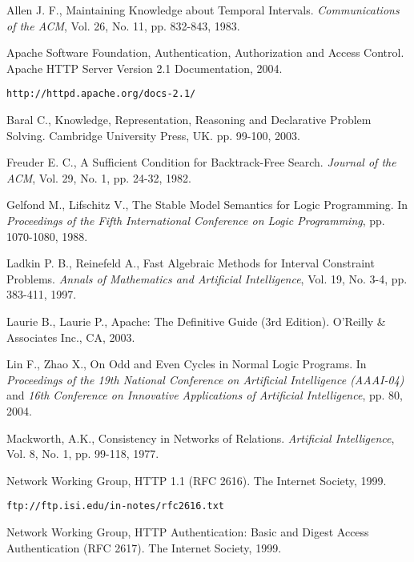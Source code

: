 \documentclass[11pt]{report}
\begin{document}
  \begin{thebibliography}{M}
      Allen J. F.,
      Maintaining Knowledge about Temporal Intervals.
      {\em Communications of the ACM},
      Vol. 26, No. 11, pp. 832-843,
      1983.

      Apache Software Foundation,
      Authentication, Authorization and Access Control.
      Apache HTTP Server Version 2.1 Documentation,
      2004.

      {\tt http://httpd.apache.org/docs-2.1/}

      Baral C.,
      Knowledge, Representation, Reasoning and Declarative Problem Solving.
      Cambridge University Press, UK.
      pp. 99-100,
      2003.

      Freuder E. C.,
      A Sufficient Condition for Backtrack-Free Search.
      {\em Journal of the ACM},
      Vol. 29, No. 1, pp. 24-32,
      1982.

      Gelfond M., Lifschitz V.,
      The Stable Model Semantics for Logic Programming.
      In {\em Proceedings of the Fifth International Conference on Logic Programming},
      pp. 1070-1080,
      1988.

      Ladkin P. B., Reinefeld A.,
      Fast Algebraic Methods for Interval Constraint Problems.
      {\em Annals of Mathematics and Artificial Intelligence},
      Vol. 19, No. 3-4, pp. 383-411,
      1997.

      Laurie B., Laurie P.,
      Apache: The Definitive Guide (3rd Edition).
      O'Reilly \& Associates Inc., CA,
      2003.

      Lin F., Zhao X.,
      On Odd and Even Cycles in Normal Logic Programs.
      In {\em Proceedings of the 19th National Conference on Artificial Intelligence (AAAI-04)}
      and {\em 16th Conference on Innovative Applications of Artificial Intelligence},
      pp. 80,
      2004.

      Mackworth, A.K.,
      Consistency in Networks of Relations.
      {\em Artificial Intelligence},
      Vol. 8, No. 1, pp. 99-118,
      1977.

      Network Working Group,
      HTTP 1.1 (RFC 2616).
      The Internet Society, 1999.

      {\tt ftp://ftp.isi.edu/in-notes/rfc2616.txt}

      Network Working Group,
      HTTP Authentication: Basic and Digest Access Authentication (RFC 2617).
      The Internet Society, 1999.


\end{thebibliography}
\end{document}
